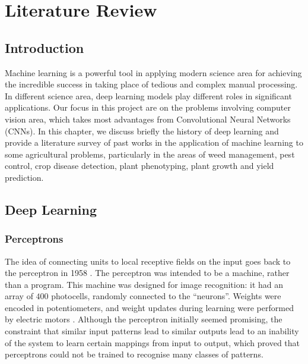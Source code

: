 \documentclass[12pt]{report}
\numberwithin{equation}{section}
\begin{document}













\chapter{Literature Review}
\setcounter{section}{-1}
\section{Introduction}
Machine learning is a powerful tool in applying modern science area for achieving the incredible success in taking place of tedious and complex manual processing. In different science area, deep learning models play different roles in significant applications. Our focus in this project are on the problems involving computer vision area, which takes most advantages from Convolutional Neural Networks (CNNs). In this chapter, we discuss briefly the history of deep learning and provide a literature survey of past works in the application of machine learning to some agricultural problems, particularly in the areas of weed management, pest control, crop disease detection, plant phenotyping, plant growth and yield prediction.

\section{Deep Learning}
\subsection{Perceptrons}
The idea of connecting units to local receptive fields on the input goes back to the perceptron in 1958 {\cite{Rosenblatt58theperceptron}}. The perceptron was intended to be a machine, rather than a program. This machine was designed for image recognition: it had an array of $400$ photocells, randomly connected to the ``neurons''. Weights were encoded in potentiometers, and weight updates during learning were performed by electric motors {\cite{10.5555/1162264}}. Although the perceptron initially seemed promising, the constraint that similar input patterns lead to similar outputs lead to an inability of the system to learn certain mappings from input to output, which proved that perceptrons could not be trained to recognise many classes of patterns. 
\end{document}

